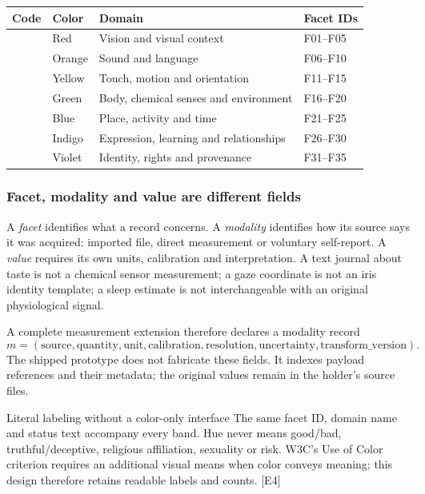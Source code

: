 \documentclass[11pt,a4paper]{article}
\newcommand{\source}[1]{{\sffamily\small\color{slate}[#1]}}
\newcommand{\band}[2]{\colorbox{#1}{\strut\makebox[11pt]{\color{white}\sffamily\bfseries #2}}}
\begin{document}
\begin{center}\begin{tabularx}{\textwidth}{@{}p{}p{}Xp{}@{}}\toprule
\textbf{Code} & \textbf{Color} & \textbf{Domain} & \textbf{Facet IDs}\\\midrule
\band{pr}{R} & Red & Vision and visual context & F01--F05\\[10pt]
\band{po}{O} & Orange & Sound and language & F06--F10\\[10pt]
\band{py}{Y} & Yellow & Touch, motion and orientation & F11--F15\\[10pt]
\band{pg}{G} & Green & Body, chemical senses and environment & F16--F20\\[10pt]
\band{pb}{B} & Blue & Place, activity and time & F21--F25\\[10pt]
\band{pi}{I} & Indigo & Expression, learning and relationships & F26--F30\\[10pt]
\band{pv}{V} & Violet & Identity, rights and provenance & F31--F35\\\bottomrule
\end{tabularx}\end{center}

\subsubsection{Facet, modality and value are different fields}
A \emph{facet} identifies what a record concerns. A \emph{modality} identifies how its source says it was acquired: imported file, direct measurement or voluntary self-report. A \emph{value} requires its own units, calibration and interpretation. A text journal about taste is not a chemical sensor measurement; a gaze coordinate is not an iris identity template; a sleep estimate is not interchangeable with an original physiological signal.

A complete measurement extension therefore declares a modality record
\[
 m=(\mathrm{source},\mathrm{quantity},\mathrm{unit},\mathrm{calibration},
       \mathrm{resolution},\mathrm{uncertainty},\mathrm{transform\_version}).
\]
The shipped prototype does not fabricate these fields. It indexes payload references and their metadata; the original values remain in the holder's source files.

\begin{note}{Literal labeling without a color-only interface}
The same facet ID, domain name and status text accompany every band. Hue never means good/bad, truthful/deceptive, religious affiliation, sexuality or risk. W3C's Use of Color criterion requires an additional visual means when color conveys meaning; this design therefore retains readable labels and counts. \source{E4}
\end{note}
\end{document}
